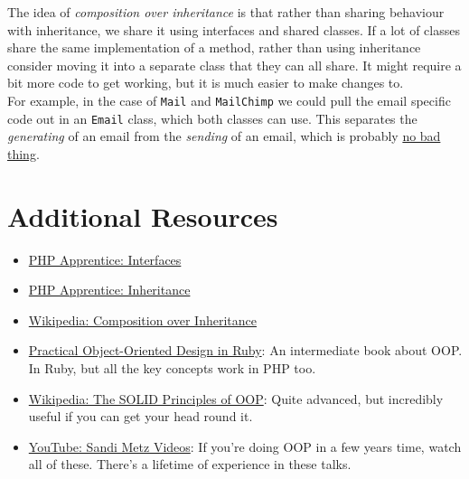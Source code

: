 
The idea of \textit{composition over inheritance} is that rather than sharing behaviour with inheritance, we share it using interfaces and shared classes. If a lot of classes share the same implementation of a method, rather than using inheritance consider moving it into a separate class that they can all share. It might require a bit more code to get working, but it is much easier to make changes to.
\\

For example, in the case of \texttt{Mail} and \texttt{MailChimp} we could pull the email specific code out in an \texttt{Email} class, which both classes can use. This separates the \textit{generating} of an email from the \textit{sending} of an email, which is probably \href{https://en.wikipedia.org/wiki/Single-responsibility_principle}{no bad thing}.



\section{Additional Resources}

\begin{itemize}[leftmargin=*]
    \item \href{https://phpapprentice.com/interfaces.html}{PHP Apprentice: Interfaces}
    \item \href{https://phpapprentice.com/classes-inheritance.html}{PHP Apprentice: Inheritance}
    \item \href{https://en.wikipedia.org/wiki/Composition\_over\_inheritance}{Wikipedia: Composition over Inheritance}
    \item \href{https://www.poodr.com}{Practical Object-Oriented Design in Ruby}: An intermediate book about OOP. In Ruby, but all the key concepts work in PHP too.
    \item \href{https://en.wikipedia.org/wiki/SOLID}{Wikipedia: The SOLID Principles of OOP}: Quite advanced, but incredibly useful if you can get your head round it.
    \item \href{https://www.youtube.com/channel/UCk3yOoaVtORwXipuLZ3jWNg}{YouTube: Sandi Metz Videos}: If you're doing OOP in a few years time, watch all of these. There's a lifetime of experience in these talks.
\end{itemize}
